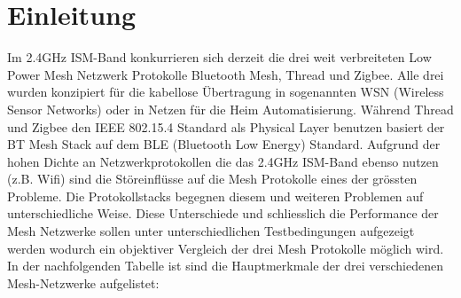 \clearpage

\section{Einleitung}\label{sec:Einleitung}
Im 2.4GHz ISM-Band konkurrieren sich derzeit die drei weit verbreiteten Low Power Mesh Netzwerk Protokolle Bluetooth Mesh, Thread und Zigbee. Alle drei wurden konzipiert für die kabellose Übertragung in sogenannten WSN (Wireless Sensor Networks) oder in Netzen für die Heim Automatisierung. Während Thread und Zigbee den IEEE 802.15.4 Standard als Physical Layer benutzen basiert der BT Mesh Stack auf dem BLE (Bluetooth Low Energy) Standard. Aufgrund der hohen Dichte an Netzwerkprotokollen die das 2.4GHz ISM-Band ebenso nutzen (z.B. Wifi) sind die Störeinflüsse auf die Mesh Protokolle eines der grössten Probleme. Die Protokollstacks begegnen diesem und weiteren Problemen auf unterschiedliche Weise. Diese Unterschiede und schliesslich die Performance der Mesh Netzwerke sollen unter unterschiedlichen Testbedingungen aufgezeigt werden wodurch ein objektiver Vergleich der drei Mesh Protokolle möglich wird. In der nachfolgenden Tabelle ist sind die Hauptmerkmale der drei verschiedenen Mesh-Netzwerke aufgelistet:

